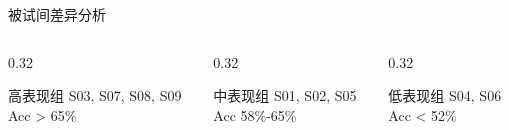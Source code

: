 \begin{frame}{被试间差异分析}
    \begin{columns}[T]
        \begin{column}{0.32\textwidth}
            \begin{block}{\centering \normalsize {高表现组}}
                S03, S07, S08, S09 \\
                Acc > 65\%
            \end{block}
        \end{column}
        \begin{column}{0.32\textwidth}
            \begin{alertblock}{\centering \normalsize {中表现组}}
                S01, S02, S05 \\
                Acc 58\%-65\%
            \end{alertblock}
        \end{column}
        \begin{column}{0.32\textwidth}
            \begin{exampleblock}{\centering \normalsize {低表现组}}
                S04, S06 \\
                Acc < 52\%
            \end{exampleblock}
        \end{column}
    \end{columns}
\end{frame}

